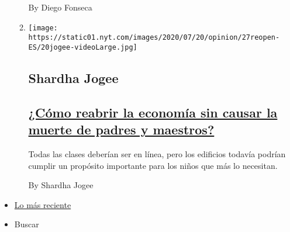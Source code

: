 \begin{enumerate}
\begin{enumerate}
    By Diego Fonseca
  \item
    \texttt{[image: https://static01.nyt.com/images/2020/07/20/opinion/27reopen-ES/20jogee-videoLarge.jpg]}

    \hypertarget{shardha-jogee}{%
    \subsection{Shardha Jogee}\label{shardha-jogee}}

    \hypertarget{cuxf3mo-reabrir-la-economuxeda-sin-causar-la-muerte-de-padres-y-maestros}{%
    \subsection{\texorpdfstring{\href{/es/2020/07/27/espanol/opinion/reabrir-escuelas-riesgo-covid.html}{¿Cómo
    reabrir la economía sin causar la muerte de padres y
    maestros?}}{¿Cómo reabrir la economía sin causar la muerte de padres y maestros?}}\label{cuxf3mo-reabrir-la-economuxeda-sin-causar-la-muerte-de-padres-y-maestros}}

    Todas las clases deberían ser en línea, pero los edificios todavía
    podrían cumplir un propósito importante para los niños que más lo
    necesitan.

    By Shardha Jogee
  \end{enumerate}
\end{enumerate}

\begin{itemize}
\tightlist
\item
  \protect\hyperlink{stream-panel}{Lo más reciente}
\item
  Buscar
\end{itemize}

